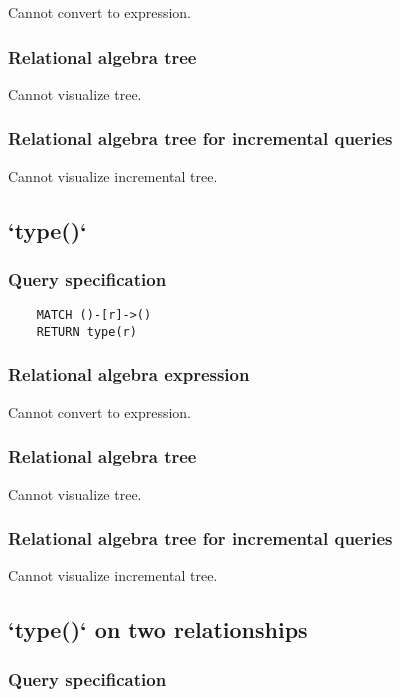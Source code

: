 	Cannot convert to expression.

	\subsubsection*{Relational algebra tree}

	Cannot visualize tree.

	\subsubsection*{Relational algebra tree for incremental queries}

	Cannot visualize incremental tree.
	\subsection{`type()`}

	\subsubsection*{Query specification}

	\begin{lstlisting}
	MATCH ()-[r]->()
	RETURN type(r)
	\end{lstlisting}


	\subsubsection*{Relational algebra expression}

	Cannot convert to expression.

	\subsubsection*{Relational algebra tree}

	Cannot visualize tree.

	\subsubsection*{Relational algebra tree for incremental queries}

	Cannot visualize incremental tree.
	\subsection{`type()` on two relationships}

	\subsubsection*{Query specification}


